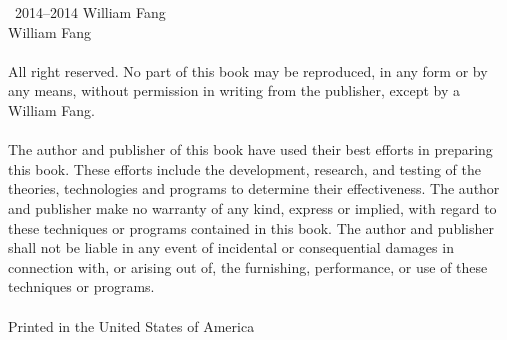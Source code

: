 \thispagestyle{empty}

\noindent\textcopyright\ 2014--2014 William Fang\\
William Fang {\lmr\textregistered}\\
\ \\
\noindent All right reserved. No part of this book may be reproduced, in any form or by any means, without permission in writing from the publisher, except by a William Fang.\\
\ \\
\noindent The author and publisher of this book have used their best efforts in preparing this book. These efforts include the development, research, and testing of the theories, technologies and programs to determine their effectiveness. The author and publisher make no warranty of any kind, express or implied, with regard to these techniques or programs contained in this book. The author and publisher shall not be liable in any event of incidental or consequential damages in connection with, or arising out of, the furnishing, performance, or use of these techniques or programs.\\
\ \\
\noindent Printed in the United States of America
